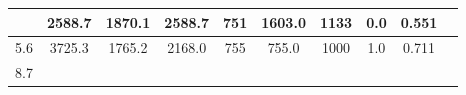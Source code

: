 \documentclass[a4paper,12pt]{article}
\begin{document}
\begin{longtable}{
     |
%    
    c|
%    
    c|
%    
    c|
%    
    c|
%    
    c|
%    
    c|
%    
    c|
%    
    c|
%    
    c|
%    
    c|
%    
    }
%        
        & 2588.7
%        

%        

%        
        & 1870.1
%        

%        

%        
        & 2588.7
%        

%        

%        
        & 751
%        

%        

%        
        & 1603.0
%        

%        

%        
        & 1133
%        

%        

%        
        & 0.0
%        

%        

%        
        & 0.551
%        

%        
        \\
        \hline

        

%        

%        
        5.6
%        

%        

%        
        & 3725.3
%        

%        

%        
        & 1765.2
%        

%        

%        
        & 2168.0
%        

%        

%        
        & 755
%        

%        

%        
        & 755.0
%        

%        

%        
        & 1000
%        

%        

%        
        & 1.0
%        

%        

%        
        & 0.711
%        

%        
        \\
        \hline

        

%        

%        
        8.7
%        

%        


\end{longtable}
\end{document}
